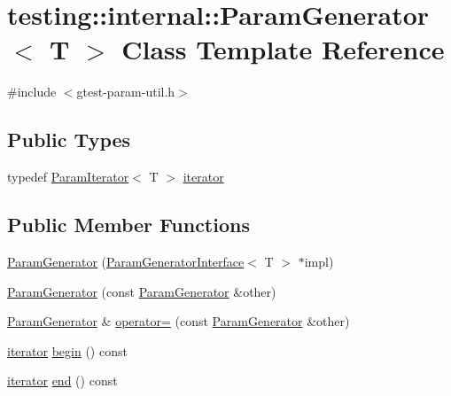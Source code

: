 \hypertarget{classtesting_1_1internal_1_1ParamGenerator}{}\section{testing\+:\+:internal\+:\+:Param\+Generator$<$ T $>$ Class Template Reference}
\label{classtesting_1_1internal_1_1ParamGenerator}


{\ttfamily \#include $<$gtest-\/param-\/util.\+h$>$}

\subsection*{Public Types}
\begin{DoxyCompactItemize}
\item 
typedef \hyperlink{classtesting_1_1internal_1_1ParamIterator}{Param\+Iterator}$<$ T $>$ \hyperlink{classtesting_1_1internal_1_1ParamGenerator_a448b08a8eaae1f1d27840d4dbd66c357}{iterator}
\end{DoxyCompactItemize}
\subsection*{Public Member Functions}
\begin{DoxyCompactItemize}
\item 
\hyperlink{classtesting_1_1internal_1_1ParamGenerator_a6b017d4d030927714d495ee95ae92fbc}{Param\+Generator} (\hyperlink{classtesting_1_1internal_1_1ParamGeneratorInterface}{Param\+Generator\+Interface}$<$ T $>$ $\ast$impl)
\item 
\hyperlink{classtesting_1_1internal_1_1ParamGenerator_a5891d25c31919b3099489f8bbcd58b5e}{Param\+Generator} (const \hyperlink{classtesting_1_1internal_1_1ParamGenerator}{Param\+Generator} \&other)
\item 
\hyperlink{classtesting_1_1internal_1_1ParamGenerator}{Param\+Generator} \& \hyperlink{classtesting_1_1internal_1_1ParamGenerator_a590a03c6e0a3a3ac6279943ad1f01dc8}{operator=} (const \hyperlink{classtesting_1_1internal_1_1ParamGenerator}{Param\+Generator} \&other)
\item 
\hyperlink{classtesting_1_1internal_1_1ParamGenerator_a448b08a8eaae1f1d27840d4dbd66c357}{iterator} \hyperlink{classtesting_1_1internal_1_1ParamGenerator_a14e735c8bd113556ae905a560cd2d607}{begin} () const
\item 
\hyperlink{classtesting_1_1internal_1_1ParamGenerator_a448b08a8eaae1f1d27840d4dbd66c357}{iterator} \hyperlink{classtesting_1_1internal_1_1ParamGenerator_aaf8f75df1099a07ff771a550b48f9fbe}{end} () const
\end{DoxyCompactItemize}
